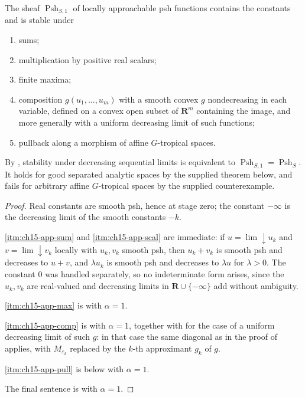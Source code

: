 \begin{theorem}
\label{thm:ch15-approachable-stability}
The sheaf $\operatorname{Psh}_{S,1}$ of locally approachable psh functions
contains the constants and is stable under
\begin{enumerate}
\item\label{itm:ch15-app-sum} sums;
\item\label{itm:ch15-app-scal} multiplication by positive real scalars;
\item\label{itm:ch15-app-max} finite maxima;
\item\label{itm:ch15-app-comp} composition $g(u_1,\dots,u_m)$ with a smooth
  convex $g$ nondecreasing in each variable, defined on a convex open subset
  of $\mathbf R^m$ containing the image, and more generally with a uniform
  decreasing limit of such functions;
\item\label{itm:ch15-app-pull} pullback along a morphism of affine
  $G$-tropical spaces.
\end{enumerate}
By , stability under decreasing
sequential limits is equivalent to
$\operatorname{Psh}_{S,1}=\operatorname{Psh}_S$.  It holds for good
separated analytic spaces by the supplied theorem below, and fails for
arbitrary affine $G$-tropical spaces by the supplied counterexample.
\end{theorem}

\begin{proof}
Real constants are smooth psh, hence at stage zero; the constant
$-\infty$ is the decreasing limit of the smooth constants $-k$.

\cref{itm:ch15-app-sum} and \cref{itm:ch15-app-scal} are immediate: if
$u=\lim\downarrow u_k$ and $v=\lim\downarrow v_k$ locally with $u_k,v_k$
smooth psh, then $u_k+v_k$ is smooth psh and decreases to $u+v$, and
$\lambda u_k$ is smooth psh and decreases to $\lambda u$ for $\lambda>0$.
The constant $0$ was handled separately, so no indeterminate form
arises, since the $u_k,v_k$ are real-valued and decreasing limits in
$\mathbf R\cup\{-\infty\}$ add without ambiguity.

\cref{itm:ch15-app-max} is  with $\alpha=1$.

\cref{itm:ch15-app-comp} is  with $\alpha=1$,
together with \cite[Corollary~8.2.2]{CLD25} for the case of a uniform
decreasing limit of such $g$: in that case the same diagonal as in the proof
of  applies, with $M_{\varepsilon_k}$ replaced
by the $k$-th approximant $g_k$ of $g$.

\cref{itm:ch15-app-pull} is  below with
$\alpha=1$.

The final sentence is  with $\alpha=1$.
\end{proof}

